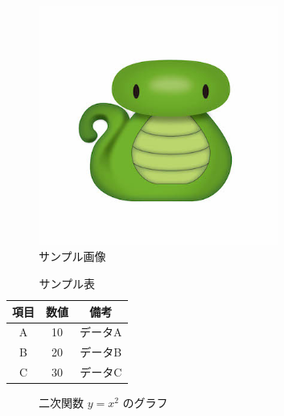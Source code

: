 \documentclass{article}
\begin{document}
\begin{figure}[htbp]
  \centering
  \includegraphics[width=0.7\textwidth]{Its_me.jpg}
  \caption{サンプル画像}
  \label{fig:sample}
\end{figure}

\begin{table}[htbp]
  \centering
  \caption{サンプル表}
  \begin{tabular}{|c|c|c|}
    \hline
    項目 & 数値 & 備考   \\
    \hline
    A  & 10 & データA \\
    B  & 20 & データB \\
    C  & 30 & データC \\
    \hline
  \end{tabular}
  \label{tab:sample}
\end{table}

\begin{figure}[htbp]
  \centering
  \caption{二次関数 $y = x^2$ のグラフ}
  \label{fig:quadratic}
\end{figure}
\end{document}
